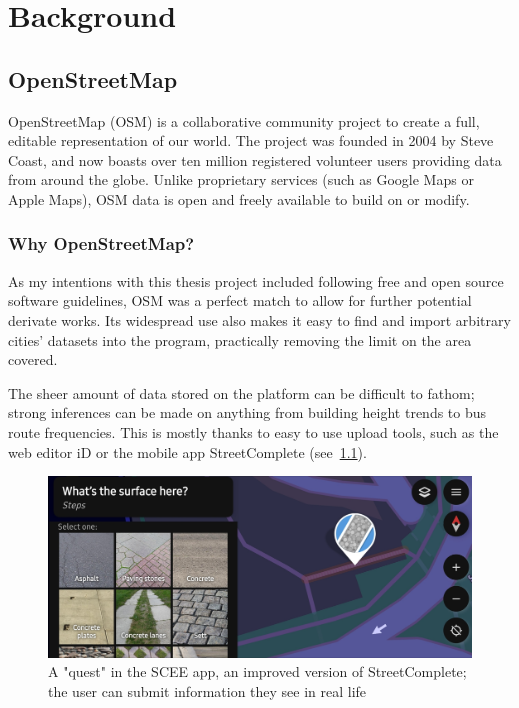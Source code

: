 \chapter{Background} %

\section{OpenStreetMap}

OpenStreetMap (OSM) is a collaborative community project to create a full, editable representation of our world. The project was founded in 2004 by Steve Coast, and now boasts over ten million registered volunteer users providing data from around the globe. Unlike proprietary services (such as Google Maps or Apple Maps), OSM data is open and freely available to build on or modify.\cite{osmHistory}

\subsection{Why OpenStreetMap?}

As my intentions with this thesis project included following free and open source software guidelines, OSM was a perfect match to allow for further potential derivate works. Its widespread use also makes it easy to find and import arbitrary cities' datasets into the program, practically removing the limit on the area covered.

The sheer amount of data stored on the platform can be difficult to fathom; strong inferences can be made on anything from building height trends to bus route frequencies. This is mostly thanks to easy to use upload tools, such as the web editor iD or the mobile app StreetComplete (see~\ref{scee}).

\begin{figure}[h]
    \centering
    \includegraphics[width=140mm, keepaspectratio]{images/scee_example.jpg}
    \caption{A "quest" in the SCEE app, an improved version of StreetComplete; the user can submit information they see in real life \label{scee}}
\end{figure}

